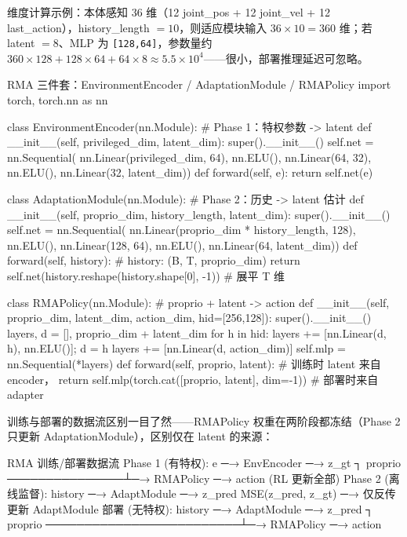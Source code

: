 维度计算示例：本体感知 36 维（12 joint\_pos + 12 joint\_vel + 12 last\_action），history\_length $=10$，则适应模块输入 $36\times10=360$ 维；若 latent $=8$、MLP 为 \verb|[128,64]|，参数量约 $360{\times}128+128{\times}64+64{\times}8\approx 5.5\times10^4$——很小，部署推理延迟可忽略。

\begin{codebox}[Python]{RMA 三件套：EnvironmentEncoder / AdaptationModule / RMAPolicy}
import torch, torch.nn as nn

class EnvironmentEncoder(nn.Module):           # Phase 1：特权参数 -> latent
    def __init__(self, privileged_dim, latent_dim):
        super().__init__()
        self.net = nn.Sequential(
            nn.Linear(privileged_dim, 64), nn.ELU(),
            nn.Linear(64, 32), nn.ELU(), nn.Linear(32, latent_dim))
    def forward(self, e): return self.net(e)

class AdaptationModule(nn.Module):             # Phase 2：历史 -> latent 估计
    def __init__(self, proprio_dim, history_length, latent_dim):
        super().__init__()
        self.net = nn.Sequential(
            nn.Linear(proprio_dim * history_length, 128), nn.ELU(),
            nn.Linear(128, 64), nn.ELU(), nn.Linear(64, latent_dim))
    def forward(self, history):                # history: (B, T, proprio_dim)
        return self.net(history.reshape(history.shape[0], -1))  # 展平 T 维

class RMAPolicy(nn.Module):                    # proprio + latent -> action
    def __init__(self, proprio_dim, latent_dim, action_dim, hid=[256,128]):
        super().__init__()
        layers, d = [], proprio_dim + latent_dim
        for h in hid: layers += [nn.Linear(d, h), nn.ELU()]; d = h
        layers += [nn.Linear(d, action_dim)]
        self.mlp = nn.Sequential(*layers)
    def forward(self, proprio, latent):        # 训练时 latent 来自 encoder，
        return self.mlp(torch.cat([proprio, latent], dim=-1))  # 部署时来自 adapter
\end{codebox}

训练与部署的数据流区别一目了然——RMAPolicy 权重在两阶段都冻结（Phase 2 只更新 AdaptationModule），区别仅在 latent 的来源：

\begin{codebox}[text]{RMA 训练/部署数据流}
Phase 1 (有特权):  e ─→ EnvEncoder ─→ z_gt ┐
                   proprio ───────────────┴─→ RMAPolicy ─→ action  (RL 更新全部)
Phase 2 (离线监督): history ─→ AdaptModule ─→ z_pred
                   MSE(z_pred, z_gt) ─→ 仅反传更新 AdaptModule
部署 (无特权):     history ─→ AdaptModule ─→ z_pred ┐
                   proprio ─────────────────────────┴─→ RMAPolicy ─→ action
\end{codebox}


